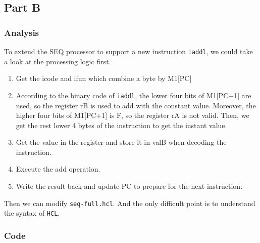\documentclass{article}
\begin{document}
\subsection{Part B}

\subsubsection{Analysis}

To extend the SEQ processor to support a new instruction \texttt{iaddl}, we could take a look at the processing logic first.
\begin{enumerate}
	\item Get the icode and ifun which combine a byte by M1[PC]
	\item According to the binary code of \texttt{iaddl}, the lower four bits of M1[PC+1] are used, so the register rB is used to add with the constant value. Moreover, the higher four bits of M1[PC+1] is F, so the register rA is not valid. Then, we get the rest lower 4 bytes of the instruction to get the instant
value.
	\item Get the value in the register and store it in valB when decoding the instruction.
	\item Execute the add operation.
	\item Write the result back and update PC to prepare for the next instruction.
\end{enumerate}
Then we can modify \texttt{seq-full.hcl}. And the only difficult point is to understand the syntax of \texttt{HCL}.
\subsubsection{Code}
\end{document}
